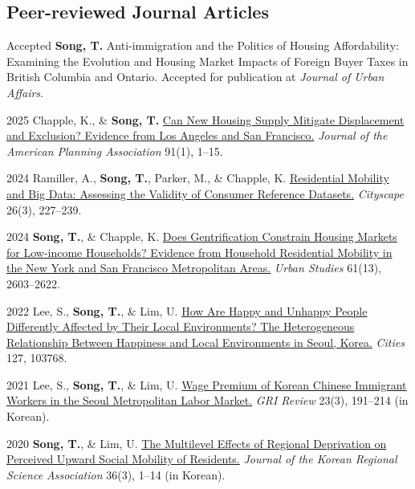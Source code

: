 \documentclass[11pt,letterpaper]{article}
\begin{document}
\subsection{Peer-reviewed Journal Articles}
\begin{tablist}
\item[Accepted] \tab{}\textbf{Song, T.} Anti-immigration and the Politics of Housing Affordability: Examining the Evolution and Housing Market Impacts of Foreign Buyer Taxes in British Columbia and Ontario. Accepted for publication at \emph{Journal of Urban Affairs}.
  \item[2025] \tab{}Chapple, K., \& \textbf{Song, T.} \href{https://doi.org/10.1080/01944363.2024.2319293}{Can New Housing Supply Mitigate Displacement and Exclusion? Evidence from Los Angeles and San Francisco.} \emph{Journal of the American Planning Association} 91(1), 1–15.
  \item[2024] \tab{}Ramiller, A., \textbf{Song, T.}, Parker, M., \& Chapple, K. \href{https://www.jstor.org/stable/48799257}{Residential Mobility and Big Data: Assessing the Validity of Consumer Reference Datasets.} \emph{Cityscape} 26(3), 227–239.
  \item[2024] \tab{}\textbf{Song, T.}, \& Chapple, K. \href{https://doi.org/10.1177/00420980241244699}{Does Gentrification Constrain Housing Markets for Low-income Households? Evidence from Household Residential Mobility in the New York and San Francisco Metropolitan Areas.} \emph{Urban Studies} 61(13), 2603–2622.
  \item[2022] \tab{}Lee, S., \textbf{Song, T.}, \& Lim, U. \href{https://doi.org/10.1016/j.cities.2022.103768}{How Are Happy and Unhappy People Differently Affected by Their Local Environments? The Heterogeneous Relationship Between Happiness and Local Environments in Seoul, Korea.} \emph{Cities} 127, 103768.
  \item[2021] \tab{}Lee, S., \textbf{Song, T.}, \& Lim, U. \href{https://www.dbpia.co.kr/Journal/articleDetail?nodeId=NODE11025769}{Wage Premium of Korean Chinese Immigrant Workers in the Seoul Metropolitan Labor Market.} \emph{GRI Review} 23(3), 191–214 (in Korean).
  \item[2020] \tab{}\textbf{Song, T.}, \& Lim, U. \href{https://www.koreascience.or.kr/article/JAKO202030161655441.page}{The Multilevel Effects of Regional Deprivation on Perceived Upward Social Mobility of Residents.} \emph{Journal of the Korean Regional Science Association} 36(3), 1–14 (in Korean).
\end{tablist}
\end{document}
